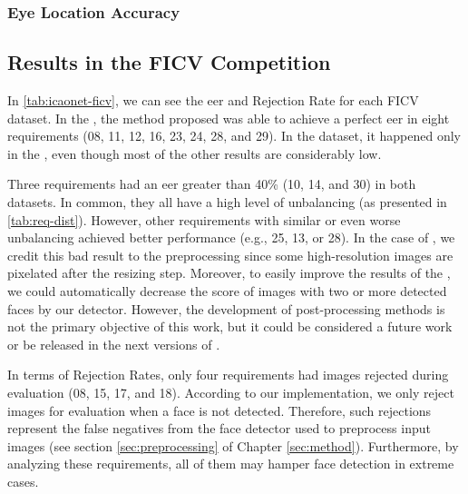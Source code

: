 

\subsubsection{Eye Location Accuracy}

\subsection{Results in the FICV Competition} \label{sec:ficv_results}

In \autoref{tab:icaonet-ficv}, we can see the \acl{eer} and Rejection Rate for each FICV dataset. In the \ficvtest, the method proposed was able to achieve a perfect \acs{eer} in eight requirements (08, 11, 12, 16, 23, 24, 28, and 29). In the \ficvofficial dataset, it happened only in the \veiloverface, even though most of the other results are considerably low. 



Three requirements had an \acs{eer} greater than 40\% (10, 14, and 30) in both datasets. In common, they all have a high level of unbalancing (as presented in \autoref{tab:req-dist}). However, other requirements with similar or even worse unbalancing achieved better performance (e.g., 25, 13, or 28). In the case of \pixelation, we credit this bad result to the preprocessing since some high-resolution images are pixelated after the resizing step. Moreover, to easily improve the results of the \otherfacesortoys, we could automatically decrease the score of images with two or more detected faces by our detector. However, the development of post-processing methods is not the primary objective of this work, but it could be considered a future work or be released in the next versions of \methodname.

In terms of Rejection Rates, only four requirements had images rejected during evaluation (08, 15, 17, and 18). According to our implementation, we only reject images for evaluation when a face is not detected. Therefore, such rejections represent the false negatives from the face detector used to preprocess input images (see section \ref{sec:preprocessing} of Chapter \ref{sec:method}). Furthermore, by analyzing these requirements, all of them may hamper face detection in extreme cases. 

